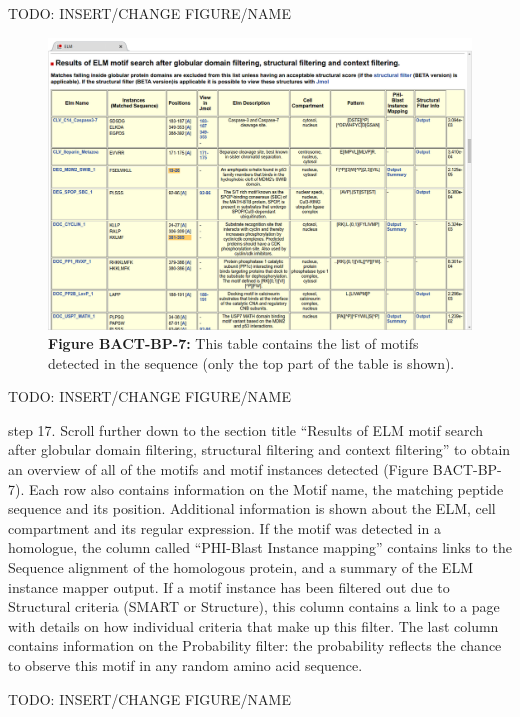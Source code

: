 TODO: INSERT/CHANGE FIGURE/NAME

\begin{figure}[h!]
\centering
\includegraphics[width=\textwidth]{Figures/TP53_1/elm_results_motifs.png}
\caption{
\textbf{Figure BACT-BP-7:} This table contains the list of motifs
detected in the sequence (only the top part of the table is shown).
}
\end{figure}

TODO: INSERT/CHANGE FIGURE/NAME

step 17. Scroll further down to the section title ``Results of ELM motif
search after globular domain filtering, structural filtering and context
filtering'' to obtain an overview of all of the motifs and motif
instances detected (Figure BACT-BP-7). Each row also contains
information on the Motif name, the matching peptide sequence and its
position. Additional information is shown about the ELM, cell
compartment and its regular expression. If the motif was detected in a
homologue, the column called ``PHI-Blast Instance mapping'' contains
links to the Sequence alignment of the homologous protein, and a summary
of the ELM instance mapper output. If a motif instance has been filtered
out due to Structural criteria (SMART or Structure), this column
contains a link to a page with details on how individual criteria that
make up this filter. The last column contains information on the
Probability filter: the probability reflects the chance to observe this
motif in any random amino acid sequence.

TODO: INSERT/CHANGE FIGURE/NAME

